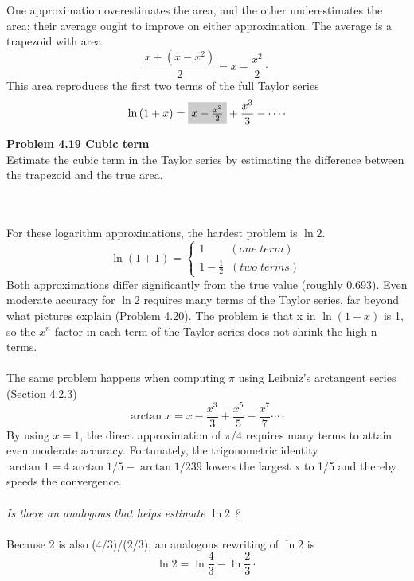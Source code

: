\documentclass{book}
\newcounter{pro1}
\begin{document}
\noindent\Large \textrm{One approximation overestimates the area, and the
other underestimates the area; their average ought
to improve on either approximation. The average is
a trapezoid with area}\\
\begin {equation}\label{formula4.33}
\frac{x+(x-x^{2})}{2}=x-\frac{x^{2}}{2}\cdot
\end{equation}
\Large \textrm{This area reproduces the first two terms of the full Taylor series}\\
\begin {equation}\label{formula4.34}
\ln{(1+x)}=\colorbox{light-gray}{$x-\frac{x^{2}}{2}$}+\frac{x^{3}}{3}-\cdots\cdot
\end{equation}
\colorbox{light-gray}{
\begin{minipage}{\textwidth}
\Large \textrm{\textbf{Problem 4.19 \;  Cubic term}\\
Estimate the cubic term in the Taylor series by estimating the difference between
the trapezoid and the true area.}
\end{minipage}}\\
\\
\Large \textrm{For these logarithm approximations, the hardest problem is $\ln{2}$.}\\
\begin {equation}\label{formula4.35}
\ln{(1+1)}=\begin{cases}1\;\;\;\;\;\;\;\;(one\;term)\\1-\frac{1}{2}\;\;(two\;terms)\end{cases}
\end{equation}
\Large \textrm{Both approximations differ significantly from the true value (roughly
0.693). Even moderate accuracy for $\ln{2}$ requires many terms of the Taylor
series, far beyond what pictures explain (Problem 4.20). The problem is
that x in $\ln{(1+x)}$ is 1, so the $x^{n}$ factor in each term of the Taylor series
does not shrink the high-n terms.}\\
\\
\Large \textrm{The same problem happens when computing $\pi$ using Leibniz’s arctangent
series (Section 4.2.3)}\\
\begin {equation}\label{formula4.36}
\arctan x=x-\frac{x^{3}}{3}+\frac{x^{5}}{5}-\frac{x^{7}}{7}\cdots\cdot
\end{equation}
\Large \textrm{By using $x = 1 $, the direct approximation of $\pi$/4 requires many terms
to attain even moderate accuracy. Fortunately, the trigonometric identity
$\arctan 1=4\arctan1/5-\arctan1/239$ lowers the largest x to 1/5 and
thereby speeds the convergence.}\\
\\
\large \textsl{Is there an analogous that helps estimate $\ln{2}$ ?}\\
\\
\Large \textrm{Because 2 is also (4/3)/(2/3), an analogous rewriting of $\ln{2}$ is}\\
\begin {equation}\label{formula4.37}
\ln{2}=\ln{\frac{4}{3}}-\ln{\frac{2}{3}}\cdot
\end{equation}
\end{document}
